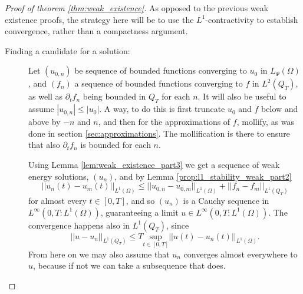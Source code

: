 \documentclass[11pt, a4paper]{article}
\begin{document}
\begin{proof}[Proof of theorem \ref{thm:weak_existence}]
As opposed to the previous weak existence proofs, the strategy here will be to use the $L^1$-contractivity to establish convergence, rather than a compactness argument.
\begin{description}
\item[Finding a candidate for a solution:]
Let $(u_{0,n})$ be sequence of bounded functions converging to $u_0$ in $L_{\Psi}(\Omega)$, and $(f_n)$ a sequence of bounded functions converging to $f$ in $L^2(Q_T)$, as well as $\partial_t f_n$ being bounded in $Q_T$ for each $n$. It will also be useful to assume $|u_{0,n}| \leq |u_0|$.
A way, to do this is first truncate $u_0$ and $f$ below and above by $-n$ and $n$, and then for the approximations of $f$, mollify, as was done in section \ref{sec:approximations}. The mollification is there to ensure that also $\partial_t f_n$ is bounded for each $n$.

Using Lemma \ref{lem:weak_existence_part3} we get a sequence of weak energy solutions, $(u_n)$, and by Lemma \ref{prop:l1_stability_weak_part2}
\begin{equation*}
||u_n(t) - u_m(t)||_{L^1(\Omega)} \leq ||u_{0,n} - u_{0,m}||_{L^1(\Omega)} + ||f_n - f_m||_{L^1(Q_T)}
\end{equation*}
for almost every $t \in [0,T]$, and so $(u_n)$ is a Cauchy sequence in $L^\infty(0,T: L^1(\Omega))$, guaranteeing a limit $u \in L^\infty(0,T: L^1(\Omega))$. The convergence happens also in $L^1(Q_T)$, since
\begin{equation*}
||u - u_n||_{L^1(Q_T)} \leq T\underset{t \in [0,T]}{\mathrm{sup}}||u(t) - u_n(t)||_{L^1(\Omega)}.
\end{equation*}
From here on we may also assume that $u_n$ converges almost everywhere to $u$, because if not we can take a subsequence that does.


\end{description}
\end{proof}
\end{document}
